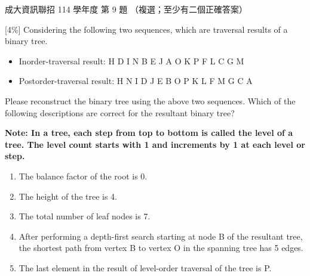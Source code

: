 \begin{pastexam}[label={px:ncku-114-prog-09}]{成大資訊聯招 114 學年度 第 9 題}
（複選；至少有二個正確答案）

{[4\%]} Considering the following two sequences, which are traversal results of a binary tree.
\begin{itemize}
\item Inorder-traversal result: \quad H D I N B E J A O K P F L C G M
\item Postorder-traversal result: \quad H N I D J E B O P K L F M G C A
\end{itemize}
Please reconstruct the binary tree using the above two sequences. Which of the following descriptions are correct for the resultant binary tree?

\textbf{Note: In a tree, each step from top to bottom is called the level of a tree. The level count starts with 1 and increments by 1 at each level or step.}
\begin{enumerate}[label=(\Alph*)]
\item The balance factor of the root is 0.
\item The height of the tree is 4.
\item The total number of leaf nodes is 7.
\item After performing a depth-first search starting at node B of the resultant tree, the shortest path from vertex B to vertex O in the spanning tree has 5 edges.
\item The last element in the result of level-order traversal of the tree is P.
\end{enumerate}
\end{pastexam}

